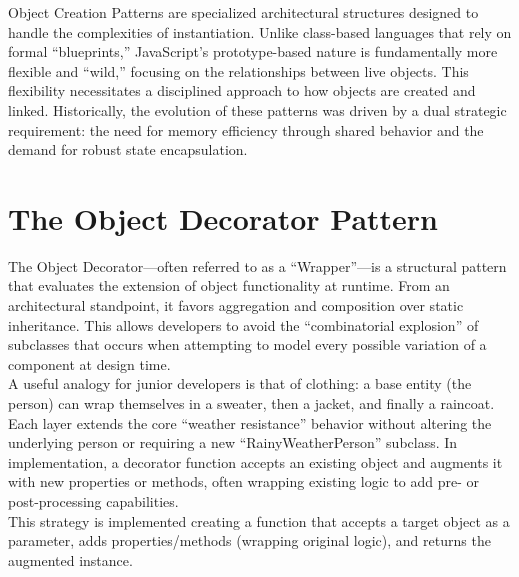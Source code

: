 \documentclass{scrbook}
\begin{document}
Object Creation Patterns are specialized architectural structures designed to handle the complexities of instantiation. Unlike class-based languages that rely on formal ``blueprints,'' JavaScript's prototype-based nature is fundamentally more flexible and ``wild,'' focusing on the relationships between live objects. This flexibility necessitates a disciplined approach to how objects are created and linked. Historically, the evolution of these patterns was driven by a dual strategic requirement: the need for memory efficiency through shared behavior and the demand for robust state encapsulation.

\section{The Object Decorator Pattern}

The Object Decorator---often referred to as a ``Wrapper''---is a structural pattern that evaluates the extension of object functionality at runtime. From an architectural standpoint, it favors aggregation and composition over static inheritance. This allows developers to avoid the ``combinatorial explosion'' of subclasses that occurs when attempting to model every possible variation of a component at design time.\\

A useful analogy for junior developers is that of clothing: a base entity (the person) can wrap themselves in a sweater, then a jacket, and finally a raincoat. Each layer extends the core ``weather resistance'' behavior without altering the underlying person or requiring a new ``RainyWeatherPerson'' subclass. In implementation, a decorator function accepts an existing object and augments it with new properties or methods, often wrapping existing logic to add pre- or post-processing capabilities.\\

This strategy is implemented creating a function that accepts a target object as a parameter, adds properties/methods (wrapping original logic), and returns the augmented instance.
\end{document}
